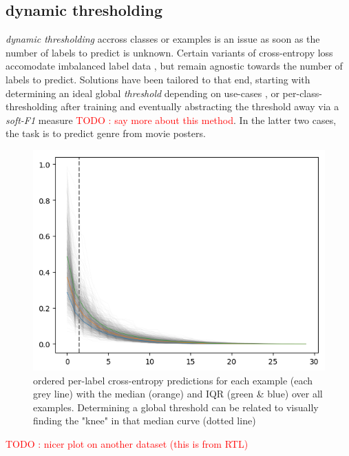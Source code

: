 \documentclass[sigconf,natbib,screen=true,review=true,anonymous]{acmart}
\newcommand\todo[1]{\textcolor{red}{TODO : #1}}
\begin{document}

\subsection{dynamic thresholding}
\label{sec:org0a345a1}

\emph{dynamic thresholding} accross classes or examples is an issue as soon as the number of labels to predict is unknown. Certain variants of cross-entropy loss accomodate imbalanced label data  \cite{focalLoss}, but remain agnostic towards the number of labels to predict. Solutions have been tailored to that end, starting with determining an ideal global \emph{threshold} depending on use-cases \cite{threshForF1}, or per-class-thresholding after training \cite{moviePosters} and eventually abstracting the threshold away via a \emph{soft-F1} measure \cite{softF1} \todo{say more about this method}. In the latter two cases, the task is to predict genre from movie posters.

\begin{figure}[htbp]
\centering
\includegraphics[width=.9\linewidth]{./images/knee.png}
\caption{\label{fig:knee}
ordered per-label cross-entropy predictions for each example (each grey line) with the median (orange) and IQR (green \& blue) over all examples. Determining a global threshold can be related to visually finding the "knee" in that median curve (dotted line)}
\end{figure}

\todo{nicer plot on another dataset (this is from RTL)}
\end{document}
